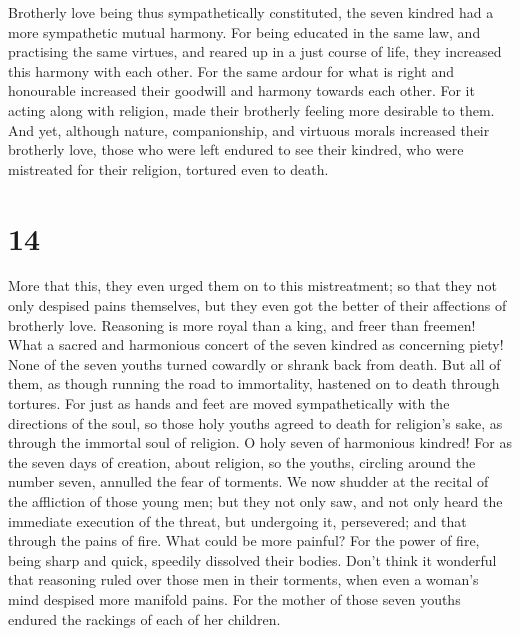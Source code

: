  Brotherly love being thus sympathetically constituted, the
seven kindred had a more sympathetic mutual harmony.  For
being educated in the same law, and practising the same virtues, and
reared up in a just course of life, they increased this harmony with
each other.  For the same ardour for what is right and
honourable increased their goodwill and harmony towards each other.
 For it acting along with religion, made their brotherly
feeling more desirable to them.  And yet, although nature,
companionship, and virtuous morals increased their brotherly love, those
who were left endured to see their kindred, who were mistreated for
their religion, tortured even to death.

\hypertarget{section-13}{%
\section{14}\label{section-13}}

 More that this, they even urged them on to this
mistreatment; so that they not only despised pains themselves, but they
even got the better of their affections of brotherly love. 
Reasoning is more royal than a king, and freer than freemen!
 What a sacred and harmonious concert of the seven kindred
as concerning piety!  None of the seven youths turned
cowardly or shrank back from death.  But all of them, as
though running the road to immortality, hastened on to death through
tortures.  For just as hands and feet are moved
sympathetically with the directions of the soul, so those holy youths
agreed to death for religion's sake, as through the immortal soul of
religion.  O holy seven of harmonious kindred! For as the
seven days of creation, about religion,  so the youths,
circling around the number seven, annulled the fear of torments.
 We now shudder at the recital of the affliction of those
young men; but they not only saw, and not only heard the immediate
execution of the threat, but undergoing it, persevered; and that through
the pains of fire.  What could be more painful? For the
power of fire, being sharp and quick, speedily dissolved their bodies.
 Don't think it wonderful that reasoning ruled over those
men in their torments, when even a woman's mind despised more manifold
pains.  For the mother of those seven youths endured the
rackings of each of her children.

